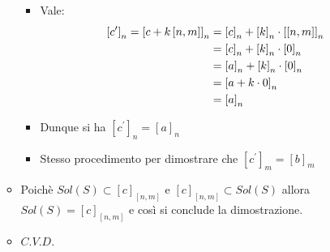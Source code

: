 \documentclass[10pt]{article}
\begin{document}
\begin{enumerate}
\begin{itemize}
\begin{itemize}
\item
Vale:
\begin{equation}
\begin{split} 
\left[c^\prime \right]_{n} = \left[c + k \left[n,m\right] \right]_{n} &= \left[c \right]_{n} + \left[k \right]_{n} \cdot \left[\left[n,m\right]\right]_{n} \\
&= \left[c \right]_{n} + \left[k \right]_{n} \cdot \left[0\right]_{n} \\
&= \left[a \right]_{n} + \left[k \right]_{n} \cdot \left[0\right]_{n} \\
&= \left[a + k \cdot 0\right]_{n} \\
&= \left[a \right]_{n}
\notag
\end{split}
\end{equation}
\item
Dunque si ha $\left[c^\prime \right]_{n} = \left[a \right]_{n}$
\item
Stesso procedimento per dimostrare che $\left[c^\prime \right]_{m} = \left[b \right]_{m}$
\end{itemize}
\item
Poichè $Sol(S) \subset \left[c\right]_{\left[n,m\right]}$ e $\left[c\right]_{\left[n,m\right]} \subset Sol(S)$ allora $Sol(S) = \left[c\right]_{\left[n,m\right]}$ e così si conclude la dimostrazione.
\item
$C.V.D.$
\end{itemize}
\end{enumerate}
\end{document}
